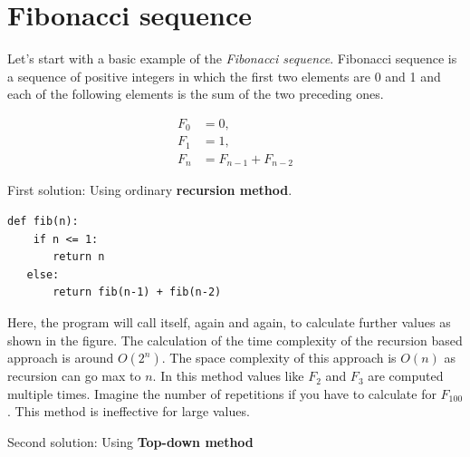 \documentclass[a4paper,11pt]{book}
\begin{document}
\section{Fibonacci sequence}

\noindent Let's start with a basic example of the \textit{Fibonacci sequence}. Fibonacci sequence is a sequence of positive integers in which the first two elements are 0 and 1 and each of the following elements is the sum of the two preceding ones.

\begin{align*}
    F_0 &= 0,\\
    F_1 &= 1,\\
    F_n &= F_{n-1} + F_{n-2}
\end{align*}

\noindent First solution: Using ordinary \textbf{recursion method}.
\begin{lstlisting}
def fib(n):
    if n <= 1:
       return n
   else:
       return fib(n-1) + fib(n-2)
\end{lstlisting}

\noindent Here, the program will call itself, again and again, to calculate further values as shown in the figure. The calculation of the time complexity of the recursion based approach is around $O(2^n)$. The space complexity of this approach is $O(n)$ as recursion can go max to $n$. In this method values like $F_2$ and $F_3$ are computed multiple times. Imagine the number of repetitions if you have to calculate for $F_{100}$. This method is ineffective for large values.

\begin{center}
\end{center}

\noindent Second solution: Using \textbf{Top-down method}
\end{document}
